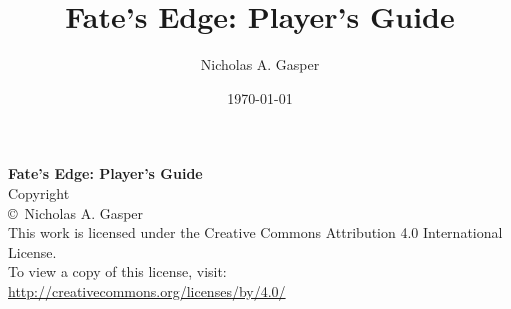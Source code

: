 \documentclass[12pt,oneside]{book}
\title{Fate's Edge: Player's Guide}
\author{Nicholas A. Gasper}
\date{\today}
\begin{document}
\frontmatter
\maketitle

\cleardoublepage
\thispagestyle{empty}
\begin{center}
  \vspace*{2in}
  \textbf{Fate's Edge: Player's Guide}\\[0.2in]
  Copyright \\
  \copyright\ Nicholas A. Gasper\\[0.2in]
  This work is licensed under the Creative Commons Attribution 4.0 International License.\\
  To view a copy of this license, visit:\\
  \url{http://creativecommons.org/licenses/by/4.0/}
\end{center}
\cleardoublepage

\tableofcontents

\mainmatter
















\backmatter
\printindex
\end{document}
